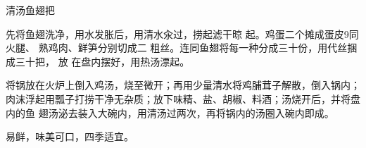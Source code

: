 \begin{recipe}{清汤鱼翅把}

\ingredients


\preparation

先将鱼翅洗净，用水发胀后，用清水汆过，捞起滤干晾 起。鸡蛋二个摊成蛋皮9同火腿、
熟鸡肉、鲜笋分别切成二 粗丝。连同鱼翅将每一种分成三十份，用代丝捆成三十把， 放
在盘内摆好，用热汤漂起。

\step 将锅放在火炉上倒入鸡汤，烧至微开；再用少量清水将鸡脯茸子解散，倒入锅内；
肉沫浮起用瓢子打捞干净无杂质；放下味精、盐、胡椒、料酒；汤烧开后，并将盘内的鱼
翅汤泌去装入大碗内，用清汤过两次，再将锅内的汤圈入碗内即成。

\features

易鲜，味美可口，四季适宜。

\end{recipe}

